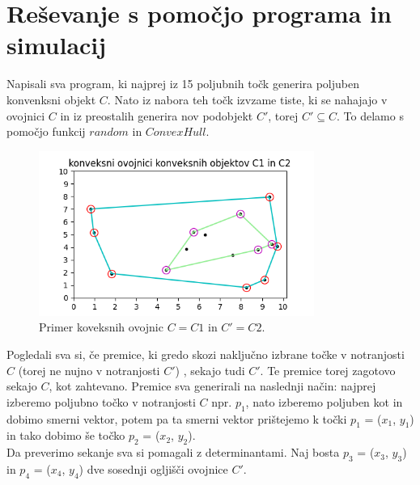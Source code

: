 \documentclass[a4paper,12pt]{article}
\begin{document}
\section{Reševanje s pomočjo programa in simulacij}
Napisali sva program, ki najprej iz 15 poljubnih točk generira poljuben konvenksni objekt $C$. Nato iz nabora teh točk izvzame tiste, ki se nahajajo v ovojnici $C$ in iz preostalih generira nov podobjekt $C'$, torej $C' \subseteq C$. To delamo s pomočjo funkcij $random$ in $ConvexHull$. 

\begin{figure}[h!]
	\begin{center}
		\includegraphics[width=9cm]{Figure_4.png}
		\caption{Primer koveksnih ovojnic $C=C1$ in $C'=C2$.}
	\end{center}
\end{figure}
Pogledali sva si, če  premice, ki gredo skozi naključno izbrane točke v notranjosti $C$ (torej ne nujno v notranjosti $C'$) , sekajo tudi $C'$. Te  premice torej zagotovo sekajo $C$, kot zahtevano.
Premice sva generirali na naslednji način: najprej izberemo poljubno točko v notranjosti $C$ npr. $p_1$, nato izberemo poljuben kot in dobimo smerni vektor, potem pa ta smerni vektor prištejemo k točki $p_1$ = ($x_1$, $y_1$) in tako dobimo še točko $p_2$ = ($x_2$, $y_2$). \\
Da preverimo sekanje sva si pomagali z determinantami. Naj bosta $p_3$ = ($x_3$, $y_3$) in $p_4$ = ($x_4$, $y_4$) dve sosednji ogljišči ovojnice $C'$.
\begin{center}
\end{center}
\end{document}
